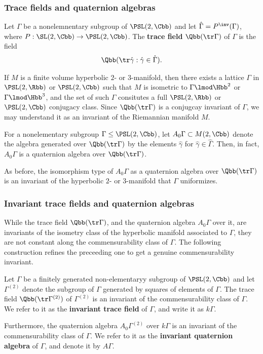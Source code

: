 \subsubsection{Trace fields and quaternion algebras}
\begin{defn}
    Let $\Gamma$ be a nonelemnentary subgroup of $\PSL(2,\Cbb)$ and let $\hat{\Gamma} = P^\inv (\Gamma)$, where $P:\SL(2,\Cbb) \to \PSL(2,\Cbb)$. The \textbf{trace field} $\Qbb(\tr \Gamma)$ of $\Gamma$ is the field
    \begin{align*}
        \Qbb(\tr \hat{\gamma}: \hat{\gamma} \in \hat{\Gamma}).
    \end{align*}
\end{defn}
\begin{rem}
    If $M$ is a finite volume hyperbolic $2$- or $3$-manifold, then there exists a lattice $\Gamma$ in $\PSL(2,\Rbb)$ or $\PSL(2,\Cbb)$ such that $M$ is isometric to $\Gamma \lmod \Hbb^2$ or $\Gamma \lmod \Hbb^3$, and the set of such $\Gamma$ consitutes a full $\PSL(2,\Rbb)$ or $\PSL(2,\Cbb)$ conjugacy class. Since $\Qbb(\tr \Gamma)$ is a conjugcay invariant of $\Gamma$, we may understand it as an invariant of the Riemannian manifold $M$.
\end{rem}
\begin{def/prop}
For a nonelementary subgroup $\Gamma \leq \PSL(2,\Cbb)$, let $A_0\Gamma\subset M(2,\Cbb)$ denote the algebra generated over $\Qbb(\tr \Gamma)$ by the elements $\hat{\gamma}$ for $\hat{\gamma} \in \hat{\Gamma}$. Then, in fact, $A_0\Gamma$ is a quaternion algebra over $\Qbb(\tr \Gamma)$.
\end{def/prop}
\begin{rem}
    As before, the isomorphism type of $A_0 \Gamma$ as a quaternion algebra over $\Qbb(\tr \Gamma)$ is an invariant of the hyperbolic $2$- or $3$-manifold that $\Gamma$ uniformizes.
\end{rem}
\subsubsection{Invariant trace fields and quaternion algebras}
While the trace field $\Qbb(\tr \Gamma)$, and the quaternion algebra $A_0 \Gamma$ over it, are invariants of the isometry class of the hyperbolic manifold associated to $\Gamma$, they are not constant along the commensurability class of $\Gamma$. The following construction refines the preceeding one to get a genuine commensurability invariant.
\begin{def/prop}
Let $\Gamma$ be a finitely generated non-elementaryy subgroup of $\PSL(2,\Cbb)$ and let $\Gamma^{(2)}$ denote the subgroup of $\Gamma$ generated by squares of elements of $\Gamma$. The trace field $\Qbb(\tr\Gamma^{(2)})$ of $\Gamma^{(2)}$ is an invariant of the commensurability class of $\Gamma$. We refer to it as the \textbf{invariant trace field} of $\Gamma$, and write it as $k\Gamma$.

Furthermore, the quaternion algebra $A_0\Gamma^{(2)}$ over $k\Gamma$ is an invariant of the commensurability class of $\Gamma$. We refer to it as the \textbf{invariant quaternion algebra} of $\Gamma$, and denote it by $A\Gamma$.
\end{def/prop}



